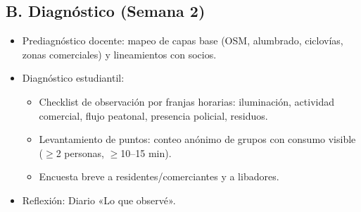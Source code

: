\documentclass[a4,11pt]{aleph-notas}
\begin{document}
\subsection*{B. Diagnóstico (Semana 2)}
\begin{itemize}
    \item {Prediagnóstico docente:} mapeo de capas base (OSM, alumbrado, ciclovías, zonas comerciales) y lineamientos con socios.
    \item {Diagnóstico estudiantil:} 
    \begin{itemize}
        \item {Checklist de observación} por franjas horarias: iluminación, actividad comercial, flujo peatonal, presencia policial, residuos.
        \item {Levantamiento de puntos}: conteo anónimo de grupos con consumo visible (\(\geq\)2 personas, \(\geq\)10--15 min).
        \item {Encuesta breve} a residentes/comerciantes y a libadores.
    \end{itemize}
    \item {Reflexión:} Diario «Lo que observé».
\end{itemize}
\end{document}
